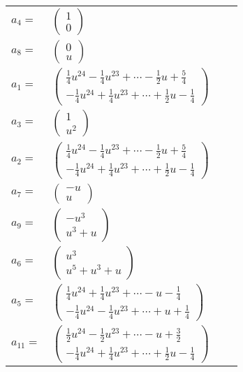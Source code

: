 \documentclass[1p]{elsarticle_modified}
\theoremstyle{definition}
\begin{document}
\begin{tabular}{m{7pt} m{180pt} m{7pt} m{180pt} }
\flushright $a_{4}=$&$\begin{pmatrix}1\\0\end{pmatrix}$ \\
\flushright $a_{8}=$&$\begin{pmatrix}0\\u\end{pmatrix}$ \\
\flushright $a_{1}=$&$\begin{pmatrix}\frac{1}{4} u^{24}-\frac{1}{4} u^{23}+\cdots-\frac{1}{2} u+\frac{5}{4}\\-\frac{1}{4} u^{24}+\frac{1}{4} u^{23}+\cdots+\frac{1}{2} u-\frac{1}{4}\end{pmatrix}$ \\
\flushright $a_{3}=$&$\begin{pmatrix}1\\u^2\end{pmatrix}$ \\
\flushright $a_{2}=$&$\begin{pmatrix}\frac{1}{4} u^{24}-\frac{1}{4} u^{23}+\cdots-\frac{1}{2} u+\frac{5}{4}\\-\frac{1}{4} u^{24}+\frac{1}{4} u^{23}+\cdots+\frac{1}{2} u-\frac{1}{4}\end{pmatrix}$ \\
\flushright $a_{7}=$&$\begin{pmatrix}- u\\u\end{pmatrix}$ \\
\flushright $a_{9}=$&$\begin{pmatrix}- u^3\\u^3+u\end{pmatrix}$ \\
\flushright $a_{6}=$&$\begin{pmatrix}u^3\\u^5+u^3+u\end{pmatrix}$ \\
\flushright $a_{5}=$&$\begin{pmatrix}\frac{1}{4} u^{24}+\frac{1}{4} u^{23}+\cdots- u-\frac{1}{4}\\-\frac{1}{4} u^{24}-\frac{1}{4} u^{23}+\cdots+u+\frac{1}{4}\end{pmatrix}$ \\
\flushright $a_{11}=$&$\begin{pmatrix}\frac{1}{2} u^{24}-\frac{1}{2} u^{23}+\cdots- u+\frac{3}{2}\\-\frac{1}{4} u^{24}+\frac{1}{4} u^{23}+\cdots+\frac{1}{2} u-\frac{1}{4}\end{pmatrix}$ \\

\end{tabular}
\end{document}
